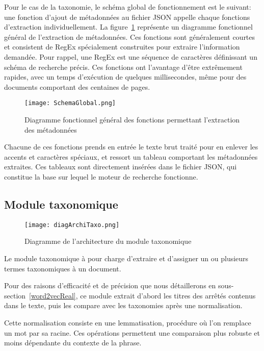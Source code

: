 Pour le cas de la taxonomie, le schéma global de fonctionnement est le suivant: une fonction d'ajout de métadonnées au fichier JSON appelle chaque fonctions d'extraction individuellement.
La figure~\ref{fig:globalMeta} représente un diagramme fonctionnel général de l'extraction de métadonnées. 
Ces fonctions sont généralement courtes et consistent de RegEx spécialement construites pour extraire l'information demandée.
Pour rappel, une RegEx est une séquence de caractères définissant un schéma de recherche précis.
Ces fonctions ont l'avantage d'être extrêmement rapides, avec un temps d'exécution de quelques millisecondes, même pour des documents comportant des centaines de pages. 

\begin{figure}[h!]
  \centering
	\texttt{[image: SchemaGlobal.png]}
	\caption[]{Diagramme fonctionnel général des fonctions permettant l'extraction des métadonnées}
  \label{fig:globalMeta}
\end{figure}

Chacune de ces fonctions prends en entrée le texte brut traité pour en enlever les accents et caractères spéciaux, et ressort un tableau comportant les métadonnées extraites.
Ces tableaux sont directement insérées dans le fichier JSON, qui constitue la base sur lequel le moteur de recherche fonctionne.


\subsection{Module taxonomique}

\begin{figure}[h!]
  \centering
  \texttt{[image: diagArchiTaxo.png]}
	\caption[]{Diagramme de l'architecture du module taxonomique}
  \label{}
\end{figure}

Le module taxonomique à pour charge d'extraire et d'assigner un ou plusieurs termes taxonomiques à un document.

Pour des raisons d'efficacité et de précision que nous détaillerons en sous-section~\ref{word2vecReal}, ce module extrait d'abord les titres des arrêtés contenus dans le texte, puis les compare avec les taxonomies après une normalisation.

Cette normalisation consiste en une lemmatisation, procédure où l'on remplace un mot par sa racine.
Ces opérations permettent une comparaison plus robuste et moins dépendante du contexte de la phrase. 

